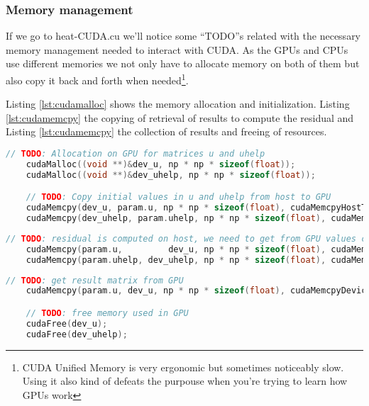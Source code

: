 \documentclass[a4paper, 10pt]{article}
\begin{document}
\subsubsection{Memory management}

If we go to heat-CUDA.cu we'll notice some ``TODO''s related with the necessary memory management needed to interact with CUDA. As the GPUs and CPUs use different memories we not only have to allocate memory on both of them but also copy it back and forth when needed\footnote{CUDA Unified Memory is very ergonomic but sometimes noticeably slow. Using it also kind of defeats the purpouse when you're trying to learn how GPUs work}.


Listing \ref{lst:cudamalloc} shows the memory allocation and initialization. Listing \ref{lst:cudamemcpy} the copying of
retrieval of results to compute the residual and Listing \ref{lst:cudamemcpy} the collection of results and freeing 
of resources.
\begin{lstlisting}[language=c, caption={Memory allocation and initialization}, label={lst:cudamalloc}]
    // TODO: Allocation on GPU for matrices u and uhelp
    cudaMalloc((void **)&dev_u, np * np * sizeof(float));
    cudaMalloc((void **)&dev_uhelp, np * np * sizeof(float));

    // TODO: Copy initial values in u and uhelp from host to GPU
    cudaMemcpy(dev_u, param.u, np * np * sizeof(float), cudaMemcpyHostToDevice);
    cudaMemcpy(dev_uhelp, param.uhelp, np * np * sizeof(float), cudaMemcpyHostToDevice);
\end{lstlisting}

\begin{lstlisting}[language=c, caption={Memory copying}, label={lst:cudamemcpy}]
    // TODO: residual is computed on host, we need to get from GPU values computed in u and uhelp
    cudaMemcpy(param.u,         dev_u, np * np * sizeof(float), cudaMemcpyDeviceToHost);
    cudaMemcpy(param.uhelp, dev_uhelp, np * np * sizeof(float), cudaMemcpyDeviceToHost);
\end{lstlisting}

\clearpage

\begin{lstlisting}[language=c, caption={Memory freeing and result retrieval}, label={lst:cudamemfree}]
    // TODO: get result matrix from GPU
    cudaMemcpy(param.u, dev_u, np * np * sizeof(float), cudaMemcpyDeviceToHost);

    // TODO: free memory used in GPU
    cudaFree(dev_u);
    cudaFree(dev_uhelp);
\end{lstlisting}
\end{document}
